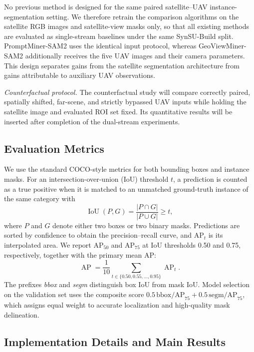 \documentclass[letterpaper,journal]{IEEEtran}
\begin{document}
No previous method is designed for the same paired satellite--UAV instance-segmentation setting. We therefore retrain the comparison algorithms on the satellite RGB images and satellite-view masks only, so that all existing methods are evaluated as single-stream baselines under the same SynSU-Build split. PromptMiner-SAM2 uses the identical input protocol, whereas GeoViewMiner-SAM2 additionally receives the five UAV images and their camera parameters. This design separates gains from the satellite segmentation architecture from gains attributable to auxiliary UAV observations.

\noindent\textit{Counterfactual protocol.}
The counterfactual study will compare correctly paired, spatially shifted, far-scene, and strictly bypassed UAV inputs while holding the satellite image and evaluated ROI set fixed. Its quantitative results will be inserted after completion of the dual-stream experiments.

\subsection{Evaluation Metrics}
\label{sec:evaluation_metrics}
We use the standard COCO-style metrics for both bounding boxes and instance masks. For an intersection-over-union (IoU) threshold $t$, a prediction is counted as a true positive when it is matched to an unmatched ground-truth instance of the same category with
\begin{equation}
\operatorname{IoU}(P,G)=\frac{|P\cap G|}{|P\cup G|}\geq t,
\end{equation}
where $P$ and $G$ denote either two boxes or two binary masks. Predictions are sorted by confidence to obtain the precision--recall curve, and AP$_t$ is its interpolated area. We report AP$_{50}$ and AP$_{75}$ at IoU thresholds 0.50 and 0.75, respectively, together with the primary mean AP:
\begin{equation}
\operatorname{AP}=\frac{1}{10}\sum_{t\in\{0.50,0.55,\ldots,0.95\}}\operatorname{AP}_t.
\end{equation}
The prefixes \emph{bbox} and \emph{segm} distinguish box IoU from mask IoU. Model selection on the validation set uses the composite score $0.5\,\text{bbox/AP}_{75}+0.5\,\text{segm/AP}_{75}$, which assigns equal weight to accurate localization and high-quality mask delineation.

\subsection{Implementation Details and Main Results}
\label{sec:implementation_results}
\end{document}
